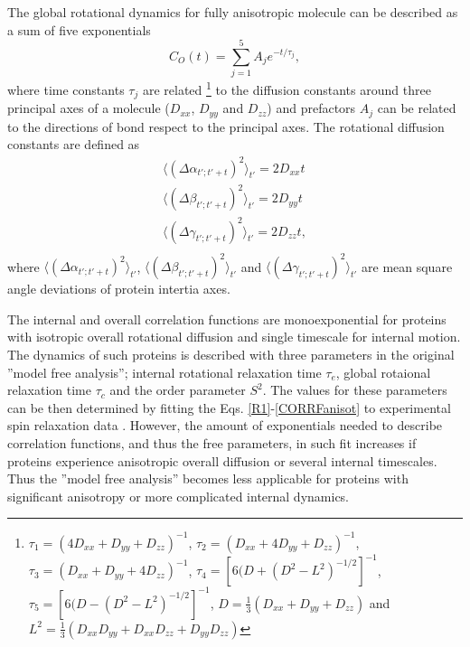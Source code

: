 \documentclass[pre,aps,floatfix,authordate1-4,twocolumn]{revtex4-1}
\begin{document}
The global rotational dynamics for fully anisotropic molecule
can be described as a sum of five exponentials \cite{woessner62,korzhnev01}
\begin{equation}\label{CORRFanisot}
  C_O(t)=\sum_{j=1}^5 A_j e^{-t/\tau_j},
\end{equation}
where time constants $\tau_j$ are related \footnote{
$\tau_1=(4D_{xx}+D_{yy}+D_{zz})^{-1}$,
$\tau_2=(D_{xx}+4D_{yy}+D_{zz})^{-1}$,
$\tau_3=(D_{xx}+D_{yy}+4D_{zz})^{-1}$,
$\tau_4=[6(D+(D^2-L^2)^{-1/2}]^{-1}$,
$\tau_5=[6(D-(D^2-L^2)^{-1/2}]^{-1}$,
$D=\frac{1}{3}(D_{xx}+D_{yy}+D_{zz})$ and 
$L^2=\frac{1}{3}(D_{xx}D_{yy}+D_{xx}D_{zz}+D_{yy}D_{zz})$} to
the diffusion constants around
three principal axes of a molecule
($D_{xx}$, $D_{yy}$ and $D_{zz}$)  and prefactors $A_j$
can be related to the directions of bond respect to the
principal axes.
The rotational diffusion constants are defined as 
\begin{equation}\label{DIFFdef}
  \begin{aligned}
    \langle (\Delta \alpha_{t';t'+t})^2 \rangle_{t'} = 2 D_{xx} t \\
    \langle (\Delta \beta_{t';t'+t})^2 \rangle_{t'} = 2 D_{yy} t \\
    \langle (\Delta \gamma_{t';t'+t})^2 \rangle_{t'} = 2 D_{zz} t, \\
  \end{aligned}
\end{equation}
where $\langle (\Delta \alpha_{t';t'+t})^2 \rangle_{t'}$,
$\langle (\Delta \beta_{t';t'+t})^2 \rangle_{t'}$ and
$\langle (\Delta \gamma_{t';t'+t})^2 \rangle_{t'}$ are mean
square angle deviations of protein intertia axes.

The internal and overall correlation functions are monoexponential for proteins 
with isotropic overall rotational diffusion and single timescale for internal motion. 
The dynamics of such proteins is described with three parameters in the
original ''model free analysis''; internal rotational relaxation time $\tau_e$,
global rotaional relaxation time $\tau_c$ and the order parameter $S^2$.
The values for these parameters can be then determined by fitting the 
Eqs. \ref{R1}-\ref{CORRFanisot} to experimental spin relaxation data \cite{??}.
However, the amount of exponentials needed to describe correlation functions,
and thus the free parameters, in such fit increases if 
proteins experience anisotropic overall diffusion or several internal timescales.
Thus the ''model free analysis'' becomes less applicable for proteins with significant
anisotropy or more complicated internal dynamics.
\end{document}
